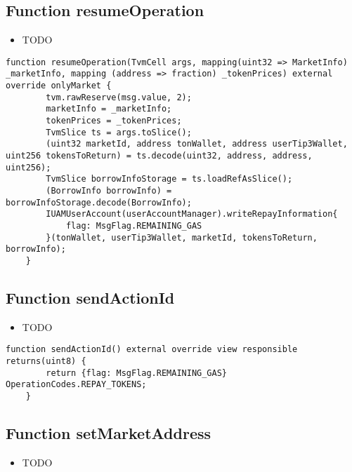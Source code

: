 \subsection{Function resumeOperation}

\noindent\begin{itemize}
\item TODO
\end{itemize}

\begin{lstlisting}[firstnumber=163]
    function resumeOperation(TvmCell args, mapping(uint32 => MarketInfo) _marketInfo, mapping (address => fraction) _tokenPrices) external override onlyMarket {
        tvm.rawReserve(msg.value, 2);
        marketInfo = _marketInfo;
        tokenPrices = _tokenPrices;
        TvmSlice ts = args.toSlice();
        (uint32 marketId, address tonWallet, address userTip3Wallet, uint256 tokensToReturn) = ts.decode(uint32, address, address, uint256);
        TvmSlice borrowInfoStorage = ts.loadRefAsSlice();
        (BorrowInfo borrowInfo) = borrowInfoStorage.decode(BorrowInfo);
        IUAMUserAccount(userAccountManager).writeRepayInformation{
            flag: MsgFlag.REMAINING_GAS
        }(tonWallet, userTip3Wallet, marketId, tokensToReturn, borrowInfo);
    }
\end{lstlisting}

\subsection{Function sendActionId}

\noindent\begin{itemize}
\item TODO
\end{itemize}

\begin{lstlisting}[firstnumber=59]
    function sendActionId() external override view responsible returns(uint8) {
        return {flag: MsgFlag.REMAINING_GAS} OperationCodes.REPAY_TOKENS;
    }
\end{lstlisting}

\subsection{Function setMarketAddress}

\noindent\begin{itemize}
\item TODO
\end{itemize}

